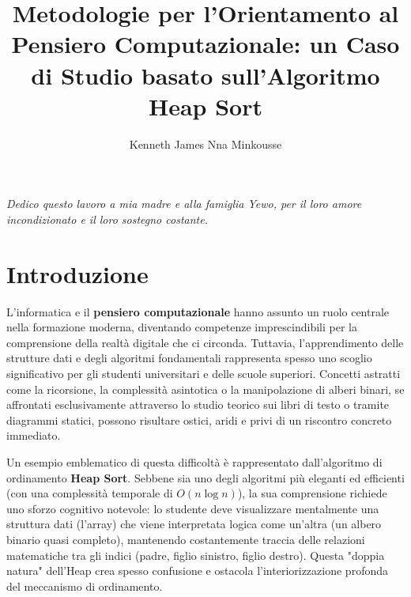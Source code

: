 \documentclass[openany]{theme/uniprthesis}
\title{Metodologie per l'Orientamento al Pensiero Computazionale: un Caso di Studio basato sull'Algoritmo Heap Sort}
\author{Kenneth James Nna Minkousse}
\begin{document}
\maketitle

\clearpage
\thispagestyle{empty}
\vspace*{\fill}
\begin{flushright}
\textit{Dedico questo lavoro a mia madre e alla famiglia Yewo, per il loro amore incondizionato e il loro sostegno costante.}
\end{flushright}
\vspace*{\fill}
\clearpage

\pagestyle{plain}
\tableofcontents
\clearpage
{}
{}
\listoffigures
\newpage



\chapter*{Introduzione}

L'informatica e il \textbf{pensiero computazionale} hanno assunto un ruolo centrale nella formazione moderna, diventando competenze imprescindibili per la comprensione della realtà digitale che ci circonda. Tuttavia, l'apprendimento delle strutture dati e degli algoritmi fondamentali rappresenta spesso uno scoglio significativo per gli studenti universitari e delle scuole superiori. Concetti astratti come la ricorsione, la complessità asintotica o la manipolazione di alberi binari, se affrontati esclusivamente attraverso lo studio teorico sui libri di testo o tramite diagrammi statici, possono risultare ostici, aridi e privi di un riscontro concreto immediato.

Un esempio emblematico di questa difficoltà è rappresentato dall'algoritmo di ordinamento \textbf{Heap Sort}. Sebbene sia uno degli algoritmi più eleganti ed efficienti (con una complessità temporale di $O(n \log n)$), la sua comprensione richiede uno sforzo cognitivo notevole: lo studente deve visualizzare mentalmente una struttura dati (l'array) che viene interpretata logica come un'altra (un albero binario quasi completo), mantenendo costantemente traccia delle relazioni matematiche tra gli indici (padre, figlio sinistro, figlio destro). Questa "doppia natura" dell'Heap crea spesso confusione e ostacola l'interiorizzazione profonda del meccanismo di ordinamento.
\end{document}
